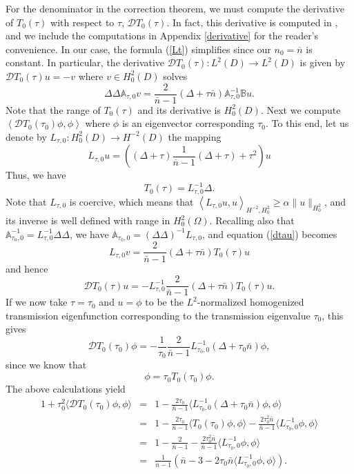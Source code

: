 \documentclass[12pt]{article}
\begin{document}
\noindent
For the denominator in the correction theorem, we must compute the derivative of $T_0(\tau)$ with respect to $\tau$, ${\mathcal D}T_0(\tau)$. In fact, this derivative is computed  in  \cite{CaMoRo}, and we include the computations in Appendix \ref{derivative} for the reader's convenience. In our case, the formula (\ref{Lt}) simplifies since our $n_0 =\overline{n}$ is constant.  In particular, the derivative ${\mathcal D}T_0(\tau): L^2(D)\to L^2(D)$ is  given by $\mathcal{D}T_0(\tau)u= -v$ where $v\in H^2_0(D)$ solves 
\begin{equation}\label{dtau}
\Delta\Delta \mathbb{A}_{\tau,0} v=  \frac{2}{\bar n-1}(\Delta + \tau \bar n) \mathbb{A}^{-1}_{\tau,0}\mathbb{B} u.
\end{equation}
Note that the range of $T_0(\tau)$ and its derivative is $H^2_0(D)$. Next we compute $\left<{\mathcal D}T_0(\tau_0) \phi,\phi \right>$ where $\phi$ is an eigenvector corresponding $\tau_0$. To this end, let us denote by $L_{\tau,0}:H^2_0(D)\to H^{-2}(D)$ the mapping
\begin{equation} \label{Ltau0} L_{\tau,0} u =\left( (\Delta +\tau ) \frac{1}{\overline{n}-1} (\Delta +\tau ) +\tau^2 \right)u\end{equation}
Thus, we have $$ T_0 (\tau)=L_{\tau,0}^{-1}\Delta.$$  Note that $L_{\tau,0}$ is coercive, which means that $\left<L_{\tau,0}u,u\right>_{H^{-2}, H^2_0}\geq \alpha \|u\|_{H^2_0}$, and its inverse is well defined with range in $H^2_0(\Omega)$. Recalling also that $\mathbb{A}^{-1}_{\tau_0,0}=L_{\tau,0}^{-1}\Delta\Delta$, we have $\mathbb{A}_{\tau_0,0}=(\Delta\Delta)^{-1} L_{\tau,0}$, and equation (\ref{dtau}) becomes 
\begin{equation}\label{dtau2}
{L}_{\tau,0} v=  \frac{2}{\bar n-1}(\Delta + \tau \bar n) T_0(\tau) u 
\end{equation}
and hence 
\begin{equation}\label{dtau3}
 \mathcal{D}T_0(\tau)u =- {L}_{\tau,0}^{-1} \frac{2}{\bar n-1}(\Delta + \tau \bar n) T_0(\tau) u. 
\end{equation}
If we now take $\tau=\tau_0$ and $u=\phi$ to be the  $L^2$-normalized homogenized transmission eigenfunction corresponding to the  transmission eigenvalue $\tau_0$,  this gives  $$\mathcal{D}T_0(\tau_0)\phi =-\frac{1}{\tau_0}\frac{2}{\bar n-1}L^{-1}_{\tau_0,0}(\Delta + \tau_0 \bar n)\phi,$$
since we know that 
$$  \phi=\tau_0 T_0(\tau_0) \phi. $$ The above calculations yield 
\begin{eqnarray}
1+ \tau_0^2\langle {\mathcal D}T_0(\tau_0) \phi,\phi \rangle &=&1-\frac{2\tau_0}{\bar n-1}\langle L^{-1}_{\tau_0,0}(\Delta + \tau_0 \bar n)\phi,\phi\rangle \label{denomform}\\
&=&1-\frac{2\tau_0}{\bar n-1}\langle T_0(\tau_0) \phi,\phi\rangle -\frac{2\tau^2_0 \bar n}{\bar n-1}\langle L^{-1}_{\tau_0,0}\phi,\phi\rangle\nonumber \\
&=&1-\frac{2}{\bar n-1}-\frac{2\tau^2_0 \bar n}{\bar n-1}\langle L^{-1}_{\tau_0,0}\phi,\phi\rangle\nonumber\\ &=& \frac{1}{\bar n-1}\left(\bar n-3  -2\tau_0\bar n \langle L^{-1}_{\tau_0,0}\phi,\phi\rangle\right).
\nonumber\end{eqnarray}
\end{document}
